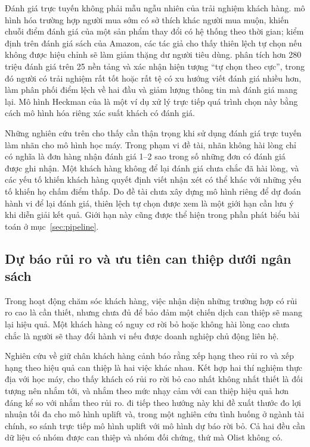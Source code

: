 \documentclass[12pt,a4paper]{report}
\begin{document}
Đánh giá trực tuyến không phải mẫu ngẫu nhiên của trải nghiệm khách hàng. \textcite{li2008} mô hình hóa trường hợp người mua sớm có sở thích khác người mua muộn, khiến chuỗi điểm đánh giá của một sản phẩm thay đổi có hệ thống theo thời gian; kiểm định trên đánh giá sách của Amazon, các tác giả cho thấy thiên lệch tự chọn nếu không được hiệu chỉnh sẽ làm giảm thặng dư người tiêu dùng. \textcite{schoenmueller2020} phân tích hơn 280 triệu đánh giá trên 25 nền tảng và xác nhận hiện tượng ``tự chọn theo cực'', trong đó người có trải nghiệm rất tốt hoặc rất tệ có xu hướng viết đánh giá nhiều hơn, làm phân phối điểm lệch về hai đầu và giảm lượng thông tin mà đánh giá mang lại. Mô hình Heckman của \textcite{deshpande2023} là một ví dụ xử lý trực tiếp quá trình chọn này bằng cách mô hình hóa riêng xác suất khách có đánh giá.

Những nghiên cứu trên cho thấy cần thận trọng khi sử dụng đánh giá trực tuyến làm nhãn cho mô hình học máy. Trong phạm vi đề tài, nhãn không hài lòng chỉ có nghĩa là đơn hàng nhận đánh giá 1–2 sao trong số những đơn có đánh giá được ghi nhận. Một khách hàng không để lại đánh giá chưa chắc đã hài lòng, và các yếu tố khiến khách hàng quyết định viết nhận xét có thể khác với những yếu tố khiến họ chấm điểm thấp. Do đề tài chưa xây dựng mô hình riêng để dự đoán hành vi để lại đánh giá, thiên lệch tự chọn được xem là một giới hạn cần lưu ý khi diễn giải kết quả. Giới hạn này cũng được thể hiện trong phần phát biểu bài toán ở mục~\ref{sec:pipeline}.

\subsection{Dự báo rủi ro và ưu tiên can thiệp dưới ngân sách}\label{sec:rel-targeting}

Trong hoạt động chăm sóc khách hàng, việc nhận diện những trường hợp có rủi ro cao là cần thiết, nhưng chưa đủ để bảo đảm một chiến dịch can thiệp sẽ mang lại hiệu quả. Một khách hàng có nguy cơ rời bỏ hoặc không hài lòng cao chưa chắc là người sẽ thay đổi hành vi nếu được doanh nghiệp chủ động liên hệ.

Nghiên cứu về giữ chân khách hàng cảnh báo rằng xếp hạng theo rủi ro và xếp hạng theo hiệu quả can thiệp là hai việc khác nhau. Kết hợp hai thí nghiệm thực địa với học máy, \textcite{ascarza2018} cho thấy khách có rủi ro rời bỏ cao nhất không nhất thiết là đối tượng nên nhắm tới, và nhắm theo mức nhạy cảm với can thiệp hiệu quả hơn đáng kể so với nhắm theo rủi ro. \textcite{devriendt2021} đi tiếp theo hướng này khi đề xuất thước đo lợi nhuận tối đa cho mô hình uplift và, trong một nghiên cứu tình huống ở ngành tài chính, so sánh trực tiếp mô hình uplift với mô hình dự báo rời bỏ. Cả hai đều cần dữ liệu có nhóm được can thiệp và nhóm đối chứng, thứ mà Olist không có.
\end{document}
